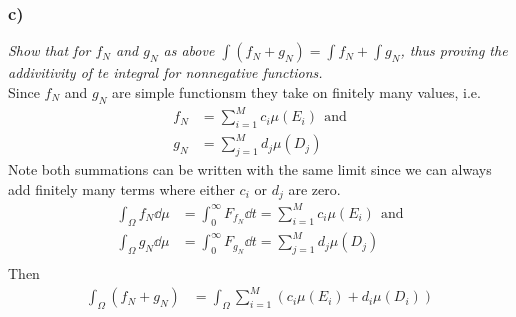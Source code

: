 \documentclass[12pt]{article}
\theoremstyle{plain}
\begin{document}
\subsubsection*{ c)}
\emph{Show that for $f_N$ and $g_N$ as above $\int(f_N + g_N) = \int f_N + \int g_N$, thus proving the addivitivity of te integral for nonnegative functions.} \\

Since $f_N$ and $g_N$ are simple functionsm they take on finitely many values, i.e.
\begin{align*}
    f_N &= \sum_{i = 1}^M c_i \mu(E_i) \ \ \text{and} \\
    g_N &= \sum_{j = 1}^M d_j \mu(D_j)
\end{align*}
Note both summations can be written with the same limit since we can always add finitely many terms where either $c_i$ or $d_j$ are zero.
\begin{align*}
    \int_\Omega f_N \dd \mu &= \int_0^\infty F_{f_N} \dd t = \sum_{i = 1}^M c_i \mu(E_i)\ \ \text{and} \\
    \int_\Omega g_N \dd \mu &= \int_0^\infty F_{g_N} \dd t = \sum_{j = 1}^M d_j \mu(D_j) \\
\end{align*}
  Then
\begin{align*}
    \int_\Omega (f_N + g_N) &= \int_\Omega \sum_{i = 1}^M (c_i \mu(E_i) + d_i \mu(D_i))
\end{align*}
\end{document}
